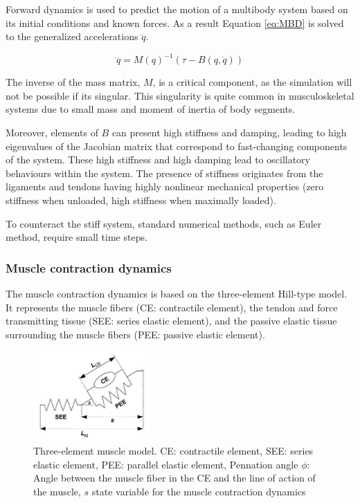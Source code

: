 Forward dynamics is used to predict the motion of a multibody system based on its initial conditions and known forces. As a result Equation \ref{eq:MBD} is solved to the generalized accelerations $\ddot{q}$.

\begin{equation}
    \ddot{q} = M(q)^{-1}(\tau - B(q,\dot{q}))
\end{equation}

The inverse of the mass matrix, $M$, is a critical component, as the simulation will not be possible if its singular. This singularity is quite common in musculoskeletal systems due to small mass and moment of inertia of body segments.

Moreover, elements of $B$ can present high stiffness and damping, leading to high eigenvalues of the Jacobian matrix that correspond to fast-changing components of the system. These high stiffness and high damping lead to oscillatory behaviours within the system. The presence of stiffness originates from the ligaments and tendons having highly nonlinear mechanical properties (zero stiffness when unloaded, high stiffness when maximally loaded).

To counteract the stiff system, standard numerical methods, such as Euler method, require small time steps.


\subsubsection{Muscle contraction dynamics} \label{musclecontraction}

The muscle contraction dynamics is based on the three-element Hill-type model. It represents the muscle fibers (CE: contractile element), the tendon and force transmitting tissue (SEE: series elastic element), and the passive elastic tissue surrounding the muscle fibers (PEE: passive elastic element). 
\begin{figure}[h!]
    \centering
\includegraphics[width=0.4\textwidth]{Pictures/DAS/Hill-Type_MuscleModel.png}
    \caption{Three-element muscle model. CE: contractile element, SEE: series elastic element, PEE: parallel elastic element, Pennation angle $\phi$: Angle between the muscle fiber in the CE and the line of action of the muscle, $s$ state variable for the muscle contraction dynamics \cite{IMP}}
    \label{fig:Hill-type}
\end{figure}


